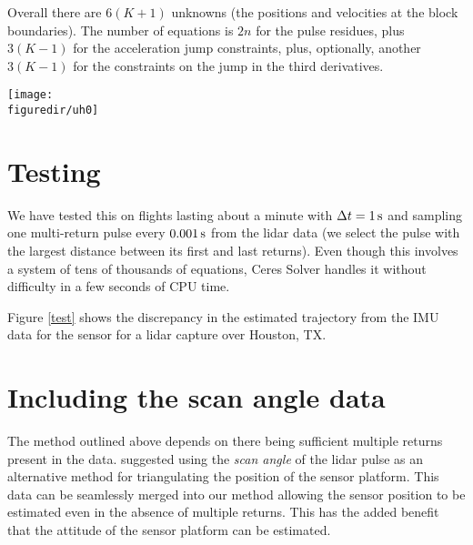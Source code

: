 \documentclass
[rmp,reprint,
twocolumn,amsmath,showkeys,letterpaper,raggedbottom]{revtex4-2}
\def\figuredir{.}
\begin{document}
Overall there are $6(K+1)$ unknowns (the positions and velocities at the
block boundaries).  The number of equations is $2n$ for the pulse
residues, plus $3(K-1)$ for the acceleration jump constraints, plus,
optionally, another $3(K-1)$ for the constraints on the jump in the
third derivatives.

\begin{figure*}[tb]
\begin{center}
\texttt{[image: \\figuredir/uh0]}
\end{center}
\caption{\label{test} The discrepancy in the estimated trajectory from
  the IMU data for the sensor for a lidar capture over Houston, TX, the
  curves labeled ``ceres.''  The RMS error in the horizontal,
  resp.~vertical, position of the sensor is $36\,\text{mm}$,
  resp.~$90\,\text{mm}$.  For comparison, also shown is the discrepancy
  using the method of \citet{gatziolis19}, the curves labeled ``G +
  McG'', with corresponding horizontal, resp.~vertical, errors of
  $221\,\text{mm}$, resp.~$354\,\text{mm}$.}
\end{figure*}

\section{Testing}

We have tested this on flights lasting about a minute with $\Delta t
= 1\,\text s$ and sampling one multi-return pulse every
$0.001\,\text s$ from the lidar data (we select the pulse with the
largest distance between its first and last returns).  Even though
this involves a system of tens of thousands of equations, Ceres Solver
handles it without difficulty in a few seconds of CPU time.

Figure \ref{test} shows the discrepancy in the estimated trajectory from
the IMU data for the sensor for a lidar capture over Houston, TX.

\section{Including the scan angle data}

The method outlined above depends on there being sufficient multiple
returns present in the data.  \citet{hartzell20} suggested using the
{\it scan angle} of the lidar pulse as an alternative method for
triangulating the position of the sensor platform.  This data can be
seamlessly merged into our method allowing the sensor position to be
estimated even in the absence of multiple returns.  This has the added
benefit that the attitude of the sensor platform can be estimated.
\end{document}

